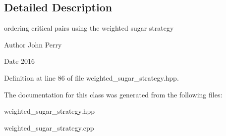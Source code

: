 \subsection{Detailed Description}
ordering critical pairs using the weighted sugar strategy 

\begin{DoxyAuthor}{Author}
John Perry 
\end{DoxyAuthor}
\begin{DoxyDate}{Date}
2016 
\end{DoxyDate}


Definition at line 86 of file weighted\+\_\+sugar\+\_\+strategy.\+hpp.



The documentation for this class was generated from the following files\+:\begin{DoxyCompactItemize}
\item 
weighted\+\_\+sugar\+\_\+strategy.\+hpp\item 
weighted\+\_\+sugar\+\_\+strategy.\+cpp\end{DoxyCompactItemize}
